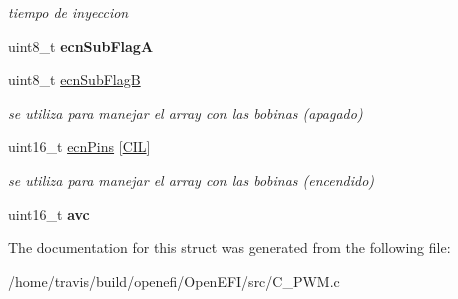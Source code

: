 \begin{DoxyCompactItemize}
\begin{DoxyCompactList}\small\item\em tiempo de inyeccion \end{DoxyCompactList}\item 
uint8\+\_\+t {\bfseries ecn\+Sub\+FlagA}\hypertarget{structC__PWM_a62a07953814c9825c4aefedf48aed271}{}\label{structC__PWM_a62a07953814c9825c4aefedf48aed271}

\item 
uint8\+\_\+t \hyperlink{structC__PWM_a834c8d7daeba6800e4055f62ce394455}{ecn\+Sub\+FlagB}\hypertarget{structC__PWM_a834c8d7daeba6800e4055f62ce394455}{}\label{structC__PWM_a834c8d7daeba6800e4055f62ce394455}

\begin{DoxyCompactList}\small\item\em se utiliza para manejar el array con las bobinas (apagado) \end{DoxyCompactList}\item 
uint16\+\_\+t \hyperlink{structC__PWM_addb10bf1c8d33c1f3193c17c2ea62205}{ecn\+Pins} \mbox{[}\hyperlink{defines_8h_a45f252e6f7774e84484118243dfe45b4}{C\+IL}\mbox{]}\hypertarget{structC__PWM_addb10bf1c8d33c1f3193c17c2ea62205}{}\label{structC__PWM_addb10bf1c8d33c1f3193c17c2ea62205}

\begin{DoxyCompactList}\small\item\em se utiliza para manejar el array con las bobinas (encendido) \end{DoxyCompactList}\item 
uint16\+\_\+t {\bfseries avc}\hypertarget{structC__PWM_a25ba9a9a31731f3c304b398a9f1ac108}{}\label{structC__PWM_a25ba9a9a31731f3c304b398a9f1ac108}

\end{DoxyCompactItemize}


The documentation for this struct was generated from the following file\+:\begin{DoxyCompactItemize}
\item 
/home/travis/build/openefi/\+Open\+E\+F\+I/src/C\+\_\+\+P\+W\+M.\+c\end{DoxyCompactItemize}
